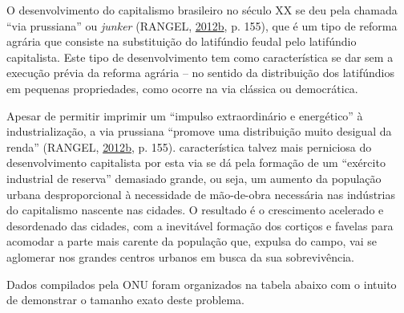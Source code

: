 \documentclass[a4paper, 12pt]{article}
\begin{document}
O desenvolvimento do capitalismo brasileiro no século XX se deu pela
chamada ``via prussiana'' ou \emph{junker} (RANGEL,
\protect\hyperlink{ref-rangel1988}{2012}\protect\hyperlink{ref-rangel1988}{b},
p. 155), que é um tipo de reforma agrária que consiste na substituição
do latifúndio feudal pelo latifúndio capitalista. Este tipo de
desenvolvimento tem como característica se dar sem a execução prévia da
reforma agrária -- no sentido da distribuição dos latifúndios em
pequenas propriedades, como ocorre na via clássica ou democrática.

Apesar de permitir imprimir um ``impulso extraordinário e energético'' à
industrialização, a via prussiana ``promove uma distribuição muito
desigual da renda'' (RANGEL,
\protect\hyperlink{ref-rangel1988}{2012}\protect\hyperlink{ref-rangel1988}{b},
p. 155). característica talvez mais perniciosa do desenvolvimento
capitalista por esta via se dá pela formação de um ``exército industrial
de reserva'' demasiado grande, ou seja, um aumento da população urbana
desproporcional à necessidade de mão-de-obra necessária nas indústrias
do capitalismo nascente nas cidades. O resultado é o crescimento
acelerado e desordenado das cidades, com a inevitável formação dos
cortiços e favelas para acomodar a parte mais carente da população que,
expulsa do campo, vai se aglomerar nos grandes centros urbanos em busca
da sua sobrevivência.

Dados compilados pela ONU foram organizados na tabela abaixo com o
intuito de demonstrar o tamanho exato deste problema.
\end{document}
